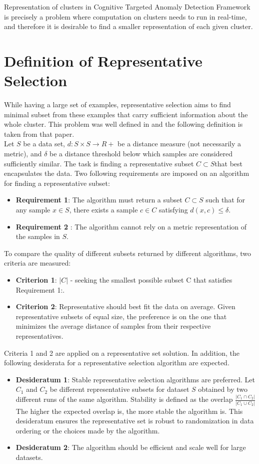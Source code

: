 \documentclass[thesis=B,english]{FITthesis}[2012/10/20]
\begin{document}
Representation of clusters in Cognitive Targeted Anomaly Detection Framework is precisely a problem where computation on clusters needs to run in real-time, and therefore it is desirable to find a smaller representation of each given cluster.

\section{Definition of Representative Selection}
While having a large set of examples, representative selection aims to find minimal subset from these examples that carry sufficient information about the whole cluster.
This problem was well defined in \cite{liebman2015representative} and the following definition is taken from that paper. \\

Let $S$ be a data set, $d : S \times S \to R +$ be a distance measure (not necessarily a metric), and $\delta$ be a distance threshold below which samples are considered sufficiently similar.
The task is finding a representative subset $C \subset S$that best encapsulates the data.
Two following requirements are imposed on an algorithm for finding a representative subset:
\begin{itemize}
    \item \textbf{Requirement 1}: The algorithm must return a subset $C \subset S$ such that for any sample $x \in S$, there exists a sample $c \in C$ satisfying $d(x, c) \le \delta$.
    \item \textbf{Requirement 2} : The algorithm cannot rely on a metric representation of the samples in $S$.
\end{itemize}
To compare the quality of different subsets returned by different algorithms, two criteria are measured:
\begin{itemize}
    \item \textbf{Criterion 1}: $|C|$ - seeking the smallest possible subset C that satisfies Requirement 1:.
    \item \textbf{Criterion 2}: Representative should best fit the data on average. Given representative subsets of equal size, the preference is on the one that minimizes the average distance of samples from their respective representatives.
\end{itemize}
Criteria 1 and 2 are applied on a representative set solution.
In addition, the following desiderata for a representative selection algorithm are expected.
\begin{itemize}
    \item \textbf{Desideratum 1}: Stable representative selection algorithms are preferred. Let $C_1$ and $C_2$ be different representative subsets for dataset $S$ obtained by two different runs of the same algorithm.
Stability is defined as the overlap $\frac{|C_1 \cap C_2|}{|C_1 \cup C_2|}$
 The higher the expected overlap is, the more stable the
algorithm is. This desideratum ensures the representative set is robust to
randomization in data ordering or the choices made by the algorithm.
    \item \textbf{Desideratum 2}: The algorithm should be efficient and scale
well for large datasets.
\end{itemize}
\end{document}
